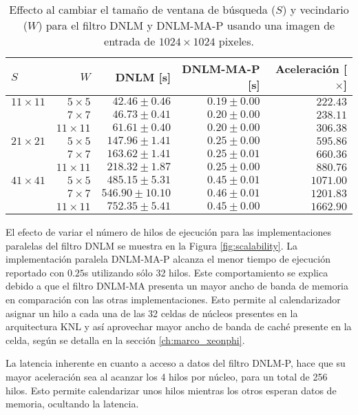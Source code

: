 \begin{table}[htb]
\protect\caption[Efecto al cambiar parámetros $S$ y $W$]{Effecto al cambiar el tama\~no de ventana de búsqueda ($S$) y vecindario ($W$) para el filtro DNLM y DNLM-MA-P usando una imagen de entrada de  $1024 \times 1024$ pixeles. \label{tabla:scala2}}
\centering
\begin{tabular}{lrrrr}
$S$  & $W$ & DNLM [s] & DNLM-MA-P [s]& Aceleración [$\times$]\tabularnewline
\hline
$11 \times 11$ & $5 \times 5$ & $42.46\pm0.46$ & $0.19\pm0.00$ & $222.43$ \tabularnewline
 & $7 \times 7$ & $46.73\pm0.41$ & $0.20\pm0.00$ & $238.11$ \tabularnewline
 & $11 \times 11$ & $61.61\pm0.40$ & $0.20\pm0.00$ & $306.38$ \tabularnewline
$21 \times 21$ & $5 \times 5$ & $147.96\pm1.41$ & $0.25\pm0.00$ & $595.86$ \tabularnewline
 & $7 \times 7$ & $163.62\pm1.41$ & $0.25\pm0.01$ & $660.36$ \tabularnewline
 & $11 \times 11$ & $218.32\pm1.87$ & $0.25\pm0.00$ & $880.76$ \tabularnewline
 $41 \times 41$ & $5 \times 5$ & $485.15\pm5.31$ & $0.45\pm0.01$ & $1071.00$ \tabularnewline
 & $7 \times 7$ & $546.90\pm10.10$ & $0.46\pm0.01$ & $1201.83$ \tabularnewline
 & $11 \times 11$ & $752.35\pm5.41$ & $0.45\pm0.00$ & $1662.90$ \tabularnewline
\end{tabular}
\end{table}




El efecto de variar el número de hilos de ejecución para las implementaciones paralelas del filtro DNLM se muestra en la Figura \ref{fig:scalability}. La implementación paralela DNLM-MA-P alcanza el menor tiempo de ejecución reportado con $0.25$s utilizando sólo 32 hilos. Este comportamiento se explica debido a que el filtro DNLM-MA presenta un mayor ancho de banda de memoria en comparación con las otras implementaciones. Esto permite al calendarizador asignar un hilo a cada una de las 32 celdas de núcleos presentes en la arquitectura  KNL y así aprovechar mayor ancho de banda de caché presente en la celda, según se detalla en la sección \ref{ch:marco_xeonphi}. 

La latencia inherente en cuanto a acceso a datos del filtro DNLM-P, hace que su mayor aceleraci\'on sea al acanzar los 4 hilos por n\'ucleo, para un total de 256 hilos. Esto permite calendarizar unos hilos mientras los otros esperan datos de memoria, ocultando la latencia.  



  
